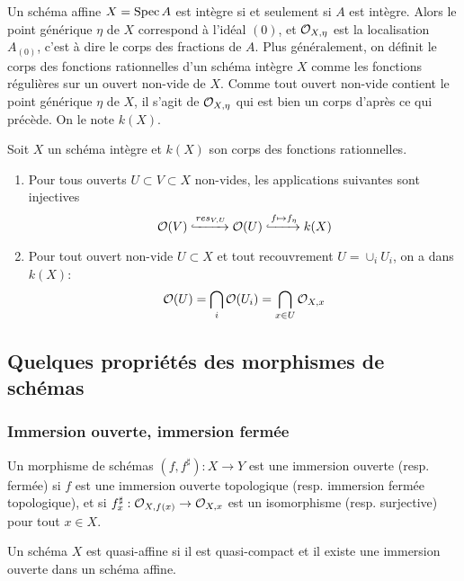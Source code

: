 Un schéma affine $X=\operatorname{Spec} A$ est intègre si et seulement si $A$ est intègre. Alors le point générique $\eta$ de $X$ correspond à l'idéal $(0)$, et $\mathcal{O}_{X,\eta}$ est la localisation $A_{(0)}$, c'est à dire le corps des fractions de $A$. Plus généralement, on définit le corps des fonctions rationnelles d'un schéma intègre $X$ comme les fonctions régulières sur un ouvert non-vide de $X$. Comme tout ouvert non-vide contient le point générique $\eta$ de $X$, il s'agit de $\mathcal{O}_{X,\eta}$ qui est bien un corps d'après ce qui précède. On le note $k(X)$.

\begin{prop}
Soit $X$ un schéma intègre et $k(X)$ son corps des fonctions rationnelles. 
\begin{enumerate}
\item Pour tous ouverts $U\subset V\subset X$ non-vides, les applications suivantes sont injectives
$$\mathcal{O}(V)\xhookrightarrow{res_{V,U}}\mathcal{O}(U)\xhookrightarrow{f\mapsto f_\eta} k(X)$$
\item Pour tout ouvert non-vide $U\subset X$ et tout recouvrement $U=\cup_i U_i$, on a dans $k(X)$:
$$\mathcal{O}(U)=\bigcap_i \mathcal{O}(U_i)=\bigcap_{x\in U}\mathcal{O}_{X,x}$$
\end{enumerate}
\end{prop}

\subsection{Quelques propriétés des morphismes de schémas}



\subsubsection{Immersion ouverte, immersion fermée}

\begin{defn}
Un morphisme de schémas $(f,f^\sharp):X\rightarrow Y$ est une immersion ouverte (resp. fermée) si $f$ est une immersion ouverte topologique (resp. immersion fermée topologique), et si $f^\sharp_x:\mathcal{O}_{X,f(x)}\rightarrow \mathcal{O}_{X,x}$ est un isomorphisme (resp. surjective) pour tout $x\in X$.
\end{defn}

\begin{defn}
Un schéma $X$ est quasi-affine si il est quasi-compact et il existe une immersion ouverte dans un schéma affine.
\end{defn}

